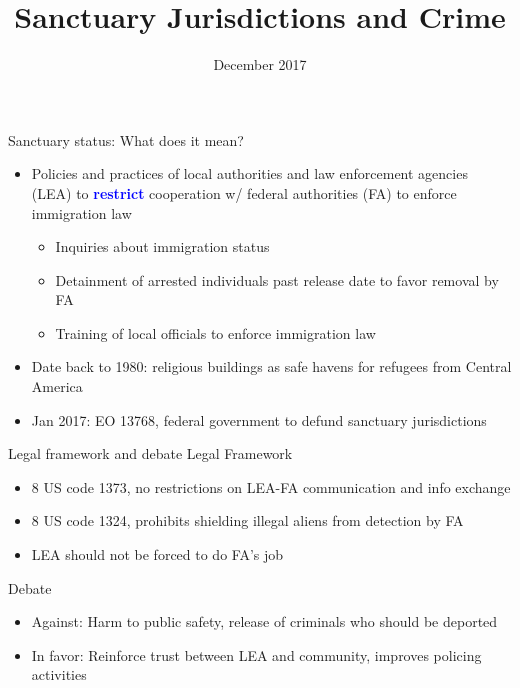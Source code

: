 \documentclass[xcolor=pdftex,dvipsnames,table,handout]{beamer}
\author[Short Name (U ABC)]{%
  \texorpdfstring{%
    \begin{columns}
      \column{.3333\linewidth}
      \centering
      Jaime Arellano-Bover \\ Stanford
      \column{.3333\linewidth}
      \centering
      Barbara Biasi \\ Princeton
    \end{columns}
 }
 {Jaime Arellano-Bover, Barbara Biasi}
}
\begin{document}
\title[Sanctuaries and Crime]{Sanctuary Jurisdictions and Crime}

\date{December 2017}

\maketitle

\begin{frame}{Sanctuary status: What does it mean?}
\pause
\begin{itemize}
\item Policies and practices of local authorities and law enforcement agencies (LEA) to \textbf{\textcolor{Blue}{restrict}} cooperation w/ federal authorities (FA) to enforce immigration law\vspace{0.10cm}\pause
\begin{itemize}
\item Inquiries about immigration status\vspace{0.10cm}
\item Detainment of arrested individuals past release date to favor removal by FA\vspace{0.10cm}
\item Training of local officials to enforce immigration law
\end{itemize}\vspace{0.20cm}\pause
\item Date back to 1980: religious buildings as safe havens for refugees from Central America\vspace{0.20cm}\pause
\item Jan 2017: EO 13768, federal government to defund sanctuary jurisdictions
\end{itemize}
\end{frame}

\begin{frame}{Legal framework and debate}
Legal Framework\vspace{0.20cm}
\begin{itemize}
\item 8 US code 1373, no restrictions on LEA-FA communication and info exchange
\item 8 US code 1324, prohibits shielding illegal aliens from detection by FA
\item  LEA should not be forced to do FA's job
\end{itemize}\vspace{0.20cm}\pause
Debate\pause
\begin{itemize}
\item Against: Harm to public safety,  release of criminals who should be deported\pause
\item In favor: Reinforce trust between LEA and community, improves policing activities
\end{itemize}
\end{frame}
\end{document}
